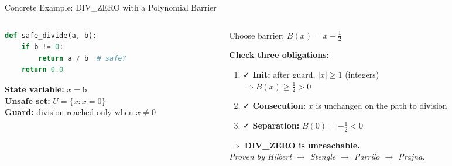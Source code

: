 \documentclass[aspectratio=169]{beamer}
\begin{document}
\begin{frame}[fragile]{Concrete Example: DIV\_ZERO with a Polynomial Barrier}
\begin{columns}[T]
\begin{column}{0.44\textwidth}
\begin{lstlisting}[language=Python]
def safe_divide(a, b):
    if b != 0:
        return a / b  # safe?
    return 0.0
\end{lstlisting}

\vspace{0.5em}
\textbf{State variable:} $x = \texttt{b}$\\[3pt]
\textbf{Unsafe set:} $U = \{x : x = 0\}$\\[3pt]
\textbf{Guard:} division reached only when $x \neq 0$
\end{column}
\begin{column}{0.52\textwidth}
\begin{block}{Choose barrier: $B(x) = x - \tfrac{1}{2}$}
\end{block}

\vspace{0.3em}
\textbf{Check three obligations:}
\begin{enumerate}
  \item \textcolor{safe}{\faCheck}\; \textbf{Init:} after guard, $|x| \ge 1$ (integers)\\$\Rightarrow B(x) \ge \tfrac{1}{2} > 0$
  \item \textcolor{safe}{\faCheck}\; \textbf{Consecution:} $x$ is unchanged on the path to division
  \item \textcolor{safe}{\faCheck}\; \textbf{Separation:} $B(0) = -\tfrac{1}{2} < 0$
\end{enumerate}

\vspace{0.5em}
$\Rightarrow$ \textbf{DIV\_ZERO is unreachable.}\\
\textit{Proven by Hilbert $\to$ Stengle $\to$ Parrilo $\to$ Prajna.}
\end{column}
\end{columns}
\end{frame}
\end{document}
